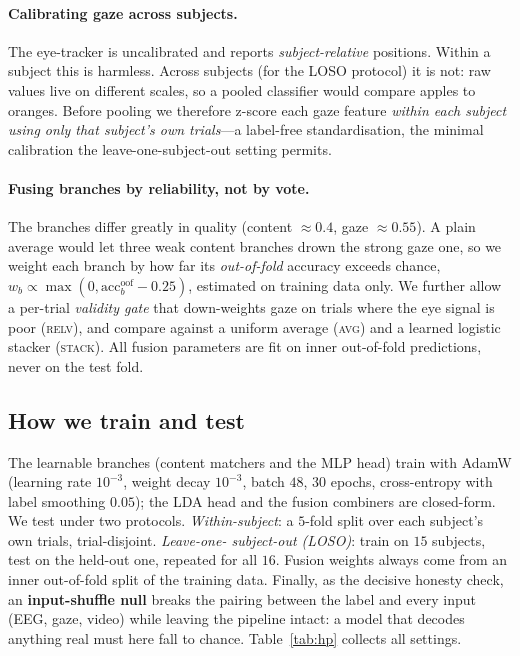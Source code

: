 \documentclass[10pt,twocolumn]{article}
\begin{document}
\paragraph{Calibrating gaze across subjects.}
The eye-tracker is uncalibrated and reports \emph{subject-relative} positions.
Within a subject this is harmless. Across subjects (for the LOSO protocol) it is
not: raw values live on different scales, so a pooled classifier would compare
apples to oranges. Before pooling we therefore z-score each gaze feature
\emph{within each subject using only that subject's own trials}---a label-free
standardisation, the minimal calibration the leave-one-subject-out setting
permits.

\paragraph{Fusing branches by reliability, not by vote.}
The branches differ greatly in quality (content $\approx\!0.4$, gaze
$\approx\!0.55$). A plain average would let three weak content branches drown the
strong gaze one, so we weight each branch by how far its \emph{out-of-fold}
accuracy exceeds chance, $w_b\!\propto\!\max(0,\mathrm{acc}^{\text{oof}}_b-0.25)$,
estimated on training data only. We further allow a per-trial \emph{validity
gate} that down-weights gaze on trials where the eye signal is poor
(\textsc{relv}), and compare against a uniform average (\textsc{avg}) and a
learned logistic stacker (\textsc{stack}). All fusion parameters are fit on inner
out-of-fold predictions, never on the test fold.

\FloatBarrier
\subsection{How we train and test}
\label{sec:asd-train}

The learnable branches (content matchers and the MLP head) train with AdamW
(learning rate $10^{-3}$, weight decay $10^{-3}$, batch $48$, $30$ epochs,
cross-entropy with label smoothing $0.05$); the LDA head and the fusion
combiners are closed-form. We test under two protocols. \emph{Within-subject}: a
$5$-fold split over each subject's own trials, trial-disjoint. \emph{Leave-one-
subject-out (LOSO)}: train on $15$ subjects, test on the held-out one, repeated
for all $16$. Fusion weights always come from an inner out-of-fold split of the
training data. Finally, as the decisive honesty check, an \textbf{input-shuffle
null} breaks the pairing between the label and every input (EEG, gaze, video)
while leaving the pipeline intact: a model that decodes anything real must here
fall to chance. Table~\ref{tab:hp} collects all settings.
\end{document}
